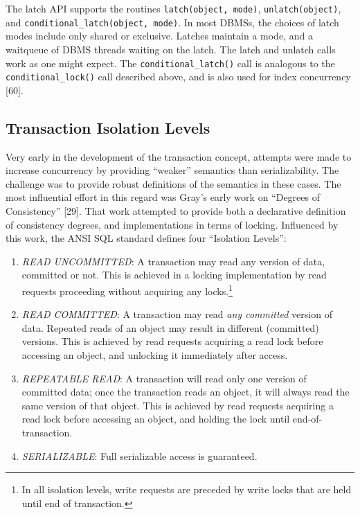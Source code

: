 \documentclass[b5paper,11pt,twoside,openright]{book}
\begin{document}
The latch API supports the routines \texttt{latch(object, mode)},
\texttt{unlatch(object)}, and \texttt{conditional\_latch(object, mode)}. In most DBMSs, the
choices of latch modes include only shared or exclusive. Latches
maintain a mode, and a waitqueue of DBMS threads waiting on the latch.
The latch and unlatch calls work as one might expect. The
\texttt{conditional\_latch()} call is analogous to the \texttt{conditional\_lock()}
call described above, and is also used for index concurrency {[}60{]}.

\hypertarget{transaction-isolation-levels}{%
\subsection{Transaction Isolation
Levels}\label{transaction-isolation-levels}}

Very early in the development of the transaction concept, attempts were
made to increase concurrency by providing ``weaker'' semantics than
serializability. The challenge was to provide robust definitions of the
semantics in these cases. The most influential effort in this regard was
Gray's early work on ``Degrees of Consistency'' {[}29{]}. That work
attempted to provide both a declarative definition of consistency
degrees, and implementations in terms of locking. Influenced by this
work, the ANSI SQL standard defines four ``Isolation Levels'':

\begin{enumerate}
\def\labelenumi{\arabic{enumi}.}

\item
  \emph{READ UNCOMMITTED}: A transaction may read any version of data,
  committed or not. This is achieved in a locking
implementation by read requests proceeding without acquiring any
locks.\footnote{In all isolation levels, write requests are preceded by write locks
that are held until end of transaction.}

\item
  \emph{READ COMMITTED}: A transaction may read \emph{any committed}
  version of data. Repeated reads of an object may result in different
  (committed) versions. This is achieved by read requests acquiring a
  read lock before accessing an object, and unlocking it immediately
  after access.
\item
  \emph{REPEATABLE READ}: A transaction will read only one version of
  committed data; once the transaction reads an object, it will always
  read the same version of that object. This is achieved by read
  requests acquiring a read lock before accessing an object, and holding
  the lock until end-of-transaction.
\item
  \emph{SERIALIZABLE}: Full serializable access is guaranteed.
\end{enumerate}
\end{document}
